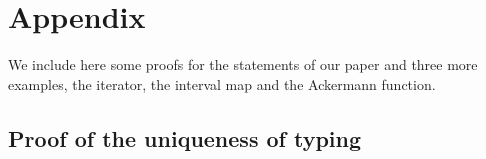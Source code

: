 \section{Appendix}
We include here some proofs for the statements of our paper and three more examples,
the iterator, the interval map and the Ackermann function.





\subsection{Proof of the uniqueness of typing}

